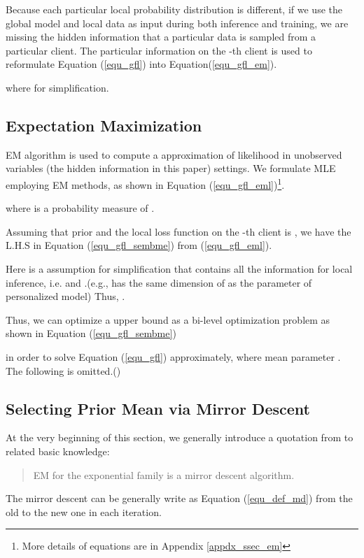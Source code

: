 \documentclass{article}
\begin{document}
Because each particular local probability distribution is different, if we use the global model and local data as input during both inference and training, we are missing the hidden information that a particular data is sampled from a particular client. The particular information  on the -th client is used to reformulate Equation (\ref{equ_gfl}) into Equation(\ref{equ_gfl_em}).

where  for simplification.

\subsection{Expectation Maximization}
\label{ssec_em}

EM algorithm is used to compute a approximation of likelihood in unobserved variables (the hidden information in this paper) settings. We formulate MLE employing EM methods, as shown in Equation (\ref{equ_gfl_eml})\footnote{More details of equations are in Appendix \ref{appdx_ssec_em}}.

where  is a probability measure of .

Assuming that prior  and the local loss function on the -th client  is , we have the L.H.S in Equation (\ref{equ_gfl_sembme}) from (\ref{equ_gfl_eml}).

Here is a assumption for simplification that  contains all the information for local inference, i.e.  and .(e.g.,  has the same dimension of  as the parameter of personalized model) Thus,  .

Thus, we can optimize a upper bound as a bi-level optimization problem as shown in Equation (\ref{equ_gfl_sembme})

in order to solve Equation (\ref{equ_gfl}) approximately, where mean parameter . The following  is omitted.()



\subsection{Selecting Prior Mean via Mirror Descent}
\label{ssec_spmmdl}

At the very beginning of this section, we generally introduce a quotation from \cite{kunstner2021homeomorphic} to related basic knowledge:

\begin{quote}
    EM for the exponential family is a mirror descent algorithm.
\end{quote}

The mirror descent can be generally write as Equation (\ref{equ_def_md}) from the old  to the new one  in each iteration.\cite{mcmahan2017survey, kunstner2021homeomorphic}
\end{document}
